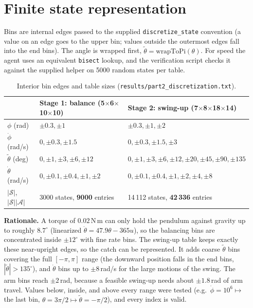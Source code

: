 \documentclass[11pt]{article}
\newcommand{\thw}{\tilde\theta}
\begin{document}
\section{Finite state representation}

Bins are internal edges passed to the supplied \texttt{discretize\_state} convention (a value on
an edge goes to the upper bin; values outside the outermost edges fall into the end bins). The
angle is wrapped first, $\thw=\mathrm{wrapToPi}(\theta)$. For speed the agent uses an equivalent
\texttt{bisect} lookup, and the verification script checks it against the supplied helper on
5000 random states per table.

\begin{table}[H]\centering\small
\begin{tabular}{lll}\toprule
 & Stage 1: balance (5$\times$6$\times$10$\times$10) & Stage 2: swing-up (7$\times$8$\times$18$\times$14)\\\midrule
$\phi$ (rad) & $\pm0.3,\pm1$ & $\pm0.3,\pm1,\pm2$\\
$\dot\phi$ (rad/s) & $0,\pm0.3,\pm1.5$ & $0,\pm0.3,\pm1.5,\pm3$\\
$\thw$ (deg) & $0,\pm1,\pm3,\pm6,\pm12$ & $0,\pm1,\pm3,\pm6,\pm12,\pm20,\pm45,\pm90,\pm135$\\
$\dot\theta$ (rad/s) & $0,\pm0.1,\pm0.4,\pm1,\pm2$ & $0,\pm0.1,\pm0.4,\pm1,\pm2,\pm4,\pm8$\\\midrule
$|\mathcal S|$, $|\mathcal S||\mathcal A|$ & 3000 states, \textbf{9000} entries & 14\,112 states, \textbf{42\,336} entries\\\bottomrule
\end{tabular}
\caption{Interior bin edges and table sizes (\texttt{results/part2\_discretization.txt}).}\label{tab:bins}
\end{table}

\textbf{Rationale.} A torque of $0.02$\,N\,m can only hold the pendulum against gravity up to
roughly $8.7^\circ$ (linearized $\ddot\theta=47.9\theta-365u$), so the balancing bins are
concentrated inside $\pm12^\circ$ with fine rate bins. The swing-up table keeps exactly these
near-upright edges, so the catch can be represented. It adds coarse $\thw$ bins covering the full
$[-\pi,\pi]$ range (the downward position falls in the end bins, $|\thw|>135^\circ$), and $\dot\theta$
bins up to $\pm8$\,rad/s for the large motions of the swing. The arm bins reach $\pm2$\,rad,
because a feasible swing-up needs about $\pm1.8$\,rad of arm travel. Values below, inside, and
above every range were tested (e.g.\ $\dot\phi=10^6\mapsto$ the last bin, $\theta=3\pi/2\mapsto
\thw=-\pi/2$), and every index is valid.
\end{document}

